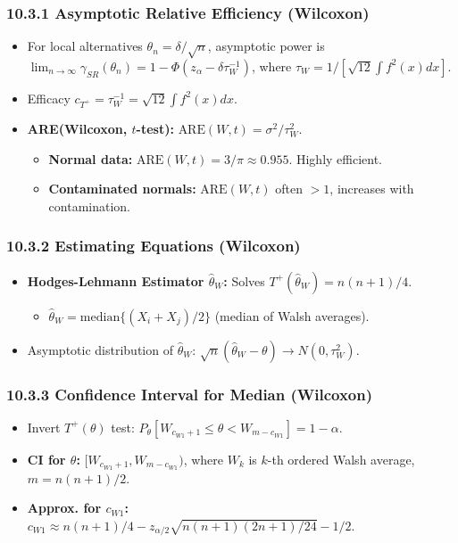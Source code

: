 \subsubsection{10.3.1 Asymptotic Relative Efficiency (Wilcoxon)}

\begin{itemize}
	\item For local alternatives $\theta_n = \delta/\sqrt{n}$, asymptotic power is $\lim_{n \to \infty} \gamma_{SR}(\theta_n) = 1 - \Phi(z_\alpha - \delta \tau_W^{-1})$, where $\tau_W = 1/[\sqrt{12}\int f^2(x)dx]$.
	\item Efficacy $c_{T^+} = \tau_W^{-1} = \sqrt{12} \int f^2(x)dx$.
	\item \textbf{ARE(Wilcoxon, $t$-test):} $\text{ARE}(W,t) = \sigma^2/\tau_W^2$.
	\begin{itemize}
		\item \textbf{Normal data:} $\text{ARE}(W,t) = 3/\pi \approx 0.955$. Highly efficient.
		\item \textbf{Contaminated normals:} $\text{ARE}(W,t)$ often $>1$, increases with contamination.
	\end{itemize}
\end{itemize}

\subsubsection{10.3.2 Estimating Equations (Wilcoxon)}

\begin{itemize}
	\item \textbf{Hodges-Lehmann Estimator $\widehat{\theta}_W$:} Solves $T^+(\widehat{\theta}_W) = n(n+1)/4$.
	\begin{itemize}
		\item $\widehat{\theta}_W = \text{median}\{(X_i+X_j)/2\}$ (median of Walsh averages).
	\end{itemize}
	\item Asymptotic distribution of $\widehat{\theta}_W$: $\sqrt{n}(\widehat{\theta}_W - \theta) \to N(0, \tau_W^2)$.
\end{itemize}

\subsubsection{10.3.3 Confidence Interval for Median (Wilcoxon)}

\begin{itemize}
	\item Invert $T^+(\theta)$ test: $P_\theta[W_{c_{W1}+1} \le \theta < W_{m-c_{W1}}] = 1-\alpha$.
	\item \textbf{CI for $\theta$:} $[W_{c_{W1}+1}, W_{m-c_{W1}})$, where $W_k$ is $k$-th ordered Walsh average, $m=n(n+1)/2$.
	\item \textbf{Approx. for $c_{W1}$:} $c_{W1} \approx n(n+1)/4 - z_{\alpha/2}\sqrt{n(n+1)(2n+1)/24} - 1/2$.
\end{itemize}

